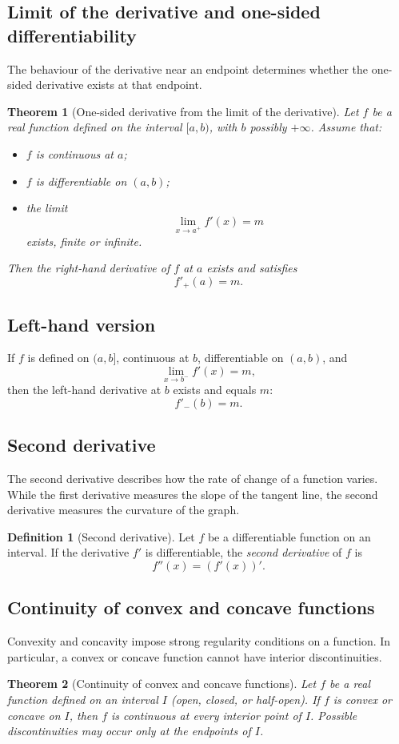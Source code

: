\documentclass[11pt,a4paper]{article}
\theoremstyle{definition} \newtheorem{definition}{Definition} \theoremstyle{plain} \newtheorem{theorem}{Theorem}
\begin{document}
\subsection{Limit of the derivative and one-sided differentiability}
The behaviour of the derivative near an endpoint determines whether the one-sided derivative exists at that endpoint.
\begin{theorem}[One-sided derivative from the limit of the derivative]\label{thm:one-sided-derivative} Let $f$ be a real function defined on the interval $[a,b)$, with $b$ possibly $+\infty$.
Assume that: \begin{itemize}
\item $f$ is continuous at $a$;
\item $f$ is differentiable on $(a,b)$;
\item the limit
\[
\lim_{x\to a^+} f'(x) = m
\]
exists, finite or infinite. \end{itemize} Then the right-hand derivative of $f$ at $a$ exists and satisfies
\[ f'_+(a) = m. \]
\end{theorem}
\subsection*{Left-hand version}
If $f$ is defined on $(a,b]$, continuous at $b$, differentiable on $(a,b)$, and
\[ \lim_{x\to b^-} f'(x) = m, \]
then the left-hand derivative at $b$ exists and equals $m$:
\[ f'_-(b) = m. \]
\subsection{Second derivative}
The second derivative describes how the rate of change of a function varies.
While the first derivative measures the slope of the tangent line, the second derivative measures the curvature of the graph.
\begin{definition}[Second derivative] Let $f$ be a differentiable function on an interval.
If the derivative $f'$ is differentiable, the \emph{second derivative} of $f$ is
\[ f''(x) = (f'(x))'. \]
\end{definition}
\subsection{Continuity of convex and concave functions}
Convexity and concavity impose strong regularity conditions on a function.
In particular, a convex or concave function cannot have interior discontinuities.
\begin{theorem}[Continuity of convex and concave functions]\label{thm:continuity-convex} Let $f$ be a real function defined on an interval $I$ (open, closed, or half-open).
If $f$ is convex or concave on $I$, then $f$ is continuous at every interior point of $I$.
Possible discontinuities may occur only at the endpoints of $I$. \end{theorem}
\end{document}
